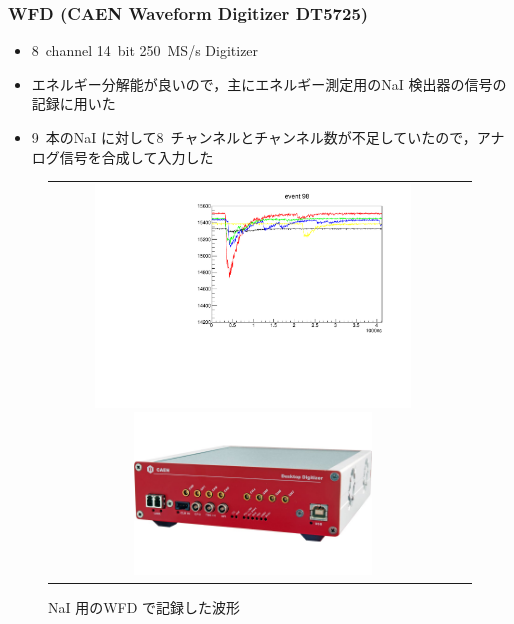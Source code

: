 \subsubsection{WFD (CAEN Waveform Digitizer DT5725)}
\begin{itemize}
\item 8~channel 14~bit 250~MS/s Digitizer
\item エネルギー分解能が良いので，主にエネルギー測定用のNaI 検出器の信号の記録に用いた
\item 9~本のNaI に対して8~チャンネルとチャンネル数が不足していたので，アナログ信号を合成して入力した
\end{itemize}
\begin{figure}[H]
\begin{tabular}{cc}
\begin{minipage}{0.5\hsize}
\centering
\includegraphics[width=0.8\textwidth,angle=-90]{figure/hayakawa/NaI_plot.pdf}
\caption{NaI 用のWFD で記録した波形}
\end{minipage}
\begin{minipage}{0.4\hsize}
\centering
\includegraphics[width=0.6\textwidth]{figure/hayakawa/DT5725_L.png}
\end{minipage}
\end{tabular}
\end{figure}

%
